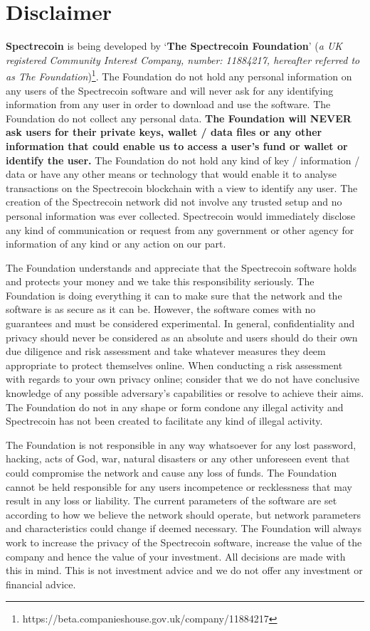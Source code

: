 \section{Disclaimer}
\textbf{Spectrecoin} is being developed by ‘\textbf{The Spectrecoin Foundation}’
(\textit{a UK registered Community Interest Company, number: 11884217, hereafter
referred to as The Foundation})\footnote{https://beta.companieshouse.gov.uk/company/11884217}.
The Foundation do not hold any personal information on any users of the
Spectrecoin software and will never ask for any identifying information
from any user in order to download and use the software. The Foundation
do not collect any personal data. \textbf{The Foundation will NEVER ask
users for their private keys, wallet / data files or any other information
that could enable us to access a user’s fund or wallet or identify the
user.} The Foundation do not hold any kind of key / information / data
or have any other means or technology that would enable it to analyse
transactions on the Spectrecoin blockchain with a view to identify any
user. The creation of the Spectrecoin network did not involve any trusted
setup and no personal information was ever collected. Spectrecoin would
immediately disclose any kind of communication or request from any
government or other agency for information of any kind or any action on
our part.



The Foundation understands and appreciate that the Spectrecoin software holds and protects your money and we take this responsibility seriously. The
Foundation is doing everything it can to make sure that the network and
the software is as secure as it can be. However, the software comes with
no guarantees and must be considered experimental. In general, confidentiality
and privacy should never be considered as an absolute and users should do their
own due diligence and risk assessment and take whatever measures they deem
appropriate to protect themselves online. When conducting a risk assessment
with regards to your own privacy online; consider that we do not have
conclusive knowledge of any possible adversary’s capabilities or resolve to
achieve their aims. The Foundation do not in any shape or form condone any
illegal activity and Spectrecoin has not been created to facilitate any kind
of illegal activity.



The Foundation is not responsible in any way whatsoever for any lost password,
hacking, acts of God, war, natural disasters or any other unforeseen event
that could compromise the network and cause any loss of funds. The Foundation
cannot be held responsible for any users incompetence or recklessness that may
result in any loss or liability. The current parameters of the software are set
according to how we believe the network should operate, but network parameters
and characteristics could change if deemed necessary. The Foundation will always
work to increase the privacy of the Spectrecoin software, increase the value of
the company and hence the value of your investment. All decisions are made with
this in mind. This is not investment advice and we do not offer any investment
or financial advice.



